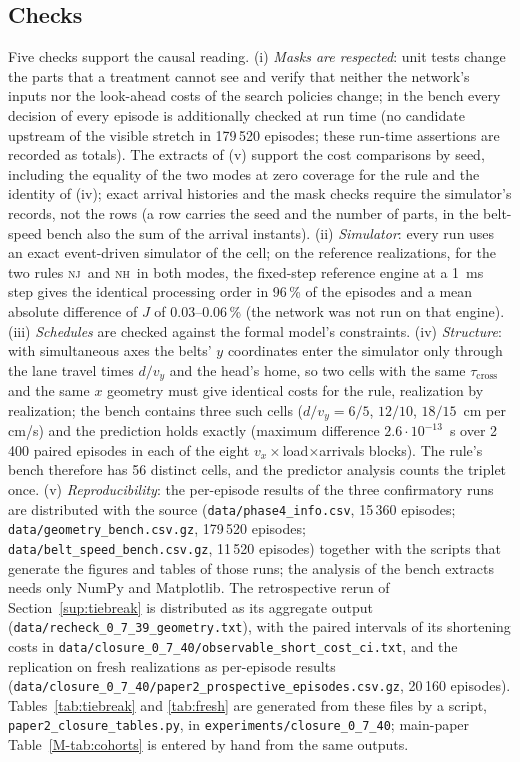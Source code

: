 \documentclass[11pt,a4paper]{article}
\newcommand{\nj}{\textsc{nj}}
\newcommand{\nh}{\textsc{nh}}
\newcommand{\tcross}{\tau_{\mathrm{cross}}}
\begin{document}
\subsection{Checks}\label{sup:checks}
Five checks support the causal reading. (i) \emph{Masks are respected}: unit tests change
the parts that a treatment cannot see and verify that neither the network's inputs nor the
look-ahead costs of the search policies change; in the bench every decision of every
episode is additionally checked at run time (no candidate upstream of the visible stretch
in 179\,520 episodes; these run-time assertions are recorded as totals). The extracts of
(v) support the cost comparisons by seed, including the equality of the two modes at
zero coverage for the rule and the identity of (iv); exact arrival histories and the mask
checks require the simulator's records, not the rows (a row carries the seed and the
number of parts, in the belt-speed bench also the sum of the arrival instants).
(ii) \emph{Simulator}: every run uses an exact event-driven
simulator of the cell; on the reference realizations, for the two rules \nj\ and \nh\ in
both modes, the fixed-step reference engine at a
1~ms step gives the identical processing order in 96\,\% of the episodes and a mean
absolute difference of $J$ of 0.03--0.06\,\% (the network was not run on that engine). (iii) \emph{Schedules} are checked against
the formal model's constraints. (iv) \emph{Structure}: with simultaneous axes the belts'
$y$ coordinates enter the simulator only through the lane travel times $d/v_y$ and the
head's home, so two cells with the same $\tcross$ and the same $x$ geometry must give
identical costs for the rule, realization by realization; the bench contains three such
cells ($d/v_y=6/5$, $12/10$, $18/15$~cm per cm/s) and the prediction holds exactly
(maximum difference $2.6\cdot10^{-13}$~s over 2\,400 paired episodes in each of the eight
$v_x\times$load$\times$arrivals blocks). The rule's bench therefore has 56 distinct cells,
and the predictor analysis counts the triplet once. (v) \emph{Reproducibility}: the
per-episode results of the three confirmatory runs are distributed with the source
(\texttt{data/phase4\_info.csv}, 15\,360 episodes; \texttt{data/geometry\_bench.csv.gz},
179\,520 episodes; \texttt{data/belt\_speed\_bench.csv.gz}, 11\,520 episodes) together with
the scripts that generate the figures and tables of those runs; the analysis of the
bench extracts needs only NumPy and Matplotlib. The retrospective rerun of
Section~\ref{sup:tiebreak} is distributed as its aggregate output
(\texttt{data/recheck\_0\_7\_39\_geometry.txt}), with the paired intervals of its
shortening costs in \texttt{data/closure\_0\_7\_40/observable\_short\_cost\_ci.txt}, and the
replication on fresh realizations as per-episode results
(\texttt{data/closure\_0\_7\_40/paper2\_prospective\_episodes.csv.gz}, 20\,160 episodes).
Tables~\ref{tab:tiebreak} and \ref{tab:fresh} are generated from these files by a
script, \texttt{paper2\_\allowbreak closure\_\allowbreak tables.py}, in
\texttt{experiments/closure\_0\_7\_40}; main-paper Table~\ref{M-tab:cohorts}
is entered by hand from the same outputs.
\end{document}
